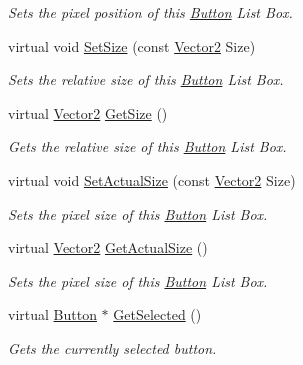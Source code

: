 \begin{DoxyCompactItemize}
\begin{DoxyCompactList}\small\item\em Sets the pixel position of this \hyperlink{classphys_1_1UI_1_1Button}{Button} List Box. \item\end{DoxyCompactList}\item 
virtual void \hyperlink{classphys_1_1UI_1_1ButtonListBox_aca2c048f3edb2f623707859225a16be9}{SetSize} (const \hyperlink{classphys_1_1Vector2}{Vector2} Size)
\begin{DoxyCompactList}\small\item\em Sets the relative size of this \hyperlink{classphys_1_1UI_1_1Button}{Button} List Box. \item\end{DoxyCompactList}\item 
virtual \hyperlink{classphys_1_1Vector2}{Vector2} \hyperlink{classphys_1_1UI_1_1ButtonListBox_a0084510b0b9c53761e5b4a45f65604ab}{GetSize} ()
\begin{DoxyCompactList}\small\item\em Gets the relative size of this \hyperlink{classphys_1_1UI_1_1Button}{Button} List Box. \item\end{DoxyCompactList}\item 
virtual void \hyperlink{classphys_1_1UI_1_1ButtonListBox_a4a04ebc31c875cd0648f1f2882249635}{SetActualSize} (const \hyperlink{classphys_1_1Vector2}{Vector2} Size)
\begin{DoxyCompactList}\small\item\em Sets the pixel size of this \hyperlink{classphys_1_1UI_1_1Button}{Button} List Box. \item\end{DoxyCompactList}\item 
virtual \hyperlink{classphys_1_1Vector2}{Vector2} \hyperlink{classphys_1_1UI_1_1ButtonListBox_a77d992f8858bf9b9eeb190dd1ea8a4fd}{GetActualSize} ()
\begin{DoxyCompactList}\small\item\em Sets the pixel size of this \hyperlink{classphys_1_1UI_1_1Button}{Button} List Box. \item\end{DoxyCompactList}\item 
virtual \hyperlink{classphys_1_1UI_1_1Button}{Button} $\ast$ \hyperlink{classphys_1_1UI_1_1ButtonListBox_a2774799b087576f9085c0d713c129e76}{GetSelected} ()
\begin{DoxyCompactList}\small\item\em Gets the currently selected button. \item\end{DoxyCompactList}\item 

\end{DoxyCompactItemize}
